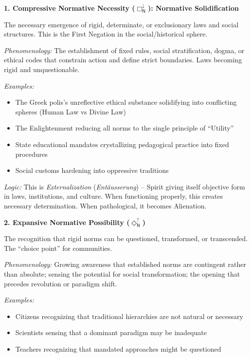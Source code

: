 \documentclass[12pt]{book}
\newcommand{\NBoxDown}{\Box_{\mathsf{N}}^{\downarrow}}
\newcommand{\NDiaUp}{\Diamond_{\mathsf{N}}^{\uparrow}}
\begin{document}
\bigskip

\noindent\textbf{1. Compressive Normative Necessity ($\NBoxDown$): Normative Solidification}

The necessary emergence of rigid, determinate, or exclusionary laws and social structures. This is the First Negation in the social/historical sphere.

\textit{Phenomenology:} The establishment of fixed rules, social stratification, dogma, or ethical codes that constrain action and define strict boundaries. Laws becoming rigid and unquestionable.

\textit{Examples:}
\begin{itemize}
\item The Greek polis's unreflective ethical substance solidifying into conflicting spheres (Human Law vs Divine Law)
\item The Enlightenment reducing all norms to the single principle of ``Utility''
\item State educational mandates crystallizing pedagogical practice into fixed procedures
\item Social customs hardening into oppressive traditions
\end{itemize}

\textit{Logic:} This is \textit{Externalization} (\emph{Entäusserung}) -- Spirit giving itself objective form in laws, institutions, and culture. When functioning properly, this creates necessary determination. When pathological, it becomes Alienation.

\bigskip

\noindent\textbf{2. Expansive Normative Possibility ($\NDiaUp$)}

The recognition that rigid norms can be questioned, transformed, or transcended. The ``choice point'' for communities.

\textit{Phenomenology:} Growing awareness that established norms are contingent rather than absolute; sensing the potential for social transformation; the opening that precedes revolution or paradigm shift.

\textit{Examples:}
\begin{itemize}
\item Citizens recognizing that traditional hierarchies are not natural or necessary
\item Scientists sensing that a dominant paradigm may be inadequate
\item Teachers recognizing that mandated approaches might be questioned
\end{itemize}
\end{document}
